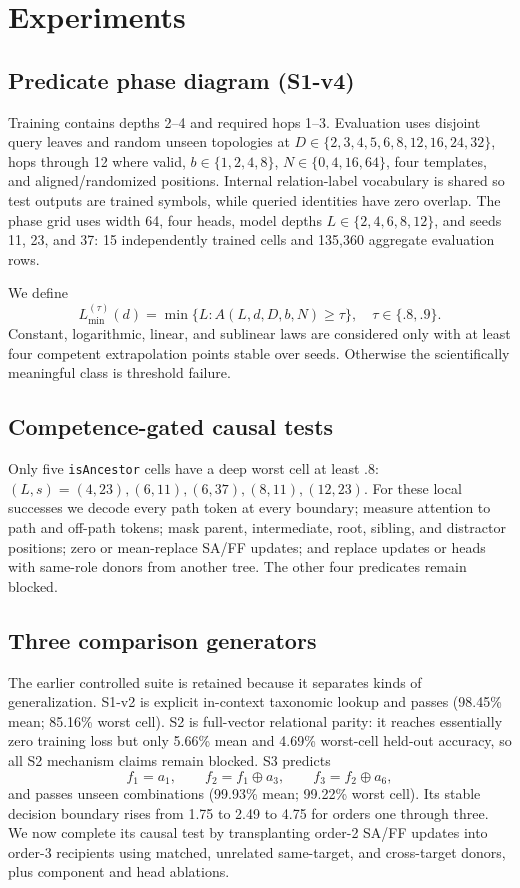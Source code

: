 \documentclass[10pt]{article}
\begin{document}
\section{Experiments}
\subsection{Predicate phase diagram (S1-v4)}
Training contains depths 2--4 and required hops 1--3. Evaluation uses disjoint query leaves and random unseen topologies at $D\in\{2,3,4,5,6,8,12,16,24,32\}$, hops through 12 where valid, $b\in\{1,2,4,8\}$, $N\in\{0,4,16,64\}$, four templates, and aligned/randomized positions. Internal relation-label vocabulary is shared so test outputs are trained symbols, while queried identities have zero overlap. The phase grid uses width 64, four heads, model depths $L\in\{2,4,6,8,12\}$, and seeds 11, 23, and 37: 15 independently trained cells and 135,360 aggregate evaluation rows.

We define
\[L_{\min}^{(\tau)}(d)=\min\{L:A(L,d,D,b,N)\ge\tau\},\quad \tau\in\{.8,.9\}.
\]
Constant, logarithmic, linear, and sublinear laws are considered only with at least four competent extrapolation points stable over seeds. Otherwise the scientifically meaningful class is threshold failure.

\subsection{Competence-gated causal tests}
Only five \texttt{isAncestor} cells have a deep worst cell at least .8: $(L,s)=(4,23),(6,11),(6,37),(8,11),(12,23)$. For these local successes we decode every path token at every boundary; measure attention to path and off-path tokens; mask parent, intermediate, root, sibling, and distractor positions; zero or mean-replace SA/FF updates; and replace updates or heads with same-role donors from another tree. The other four predicates remain blocked.

\subsection{Three comparison generators}
The earlier controlled suite is retained because it separates kinds of generalization. S1-v2 is explicit in-context taxonomic lookup and passes (98.45\% mean; 85.16\% worst cell). S2 is full-vector relational parity: it reaches essentially zero training loss but only 5.66\% mean and 4.69\% worst-cell held-out accuracy, so all S2 mechanism claims remain blocked. S3 predicts
\[f_1=a_1,\qquad f_2=f_1\oplus a_3,\qquad f_3=f_2\oplus a_6,
\]
and passes unseen combinations (99.93\% mean; 99.22\% worst cell). Its stable decision boundary rises from 1.75 to 2.49 to 4.75 for orders one through three. We now complete its causal test by transplanting order-2 SA/FF updates into order-3 recipients using matched, unrelated same-target, and cross-target donors, plus component and head ablations.
\end{document}
